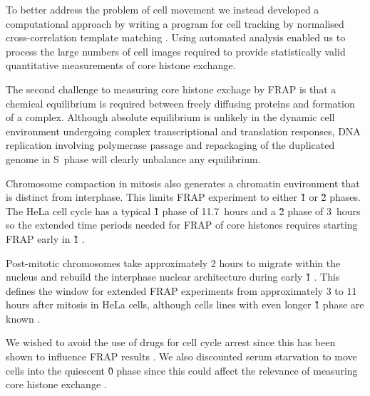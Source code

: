     To better address the problem of cell movement we
    instead developed a computational approach
    by writing a program for cell tracking by normalised
    cross-correlation template matching  .
    Using automated analysis enabled us to process
    the large numbers of cell images
    required to provide statistically valid
    quantitative measurements of core histone exchange.


    The second challenge to measuring core histone exchage by FRAP is that
    a chemical equilibrium is required between freely diffusing proteins and
    formation of a complex. Although absolute equilibrium is unlikely
    in the dynamic cell environment undergoing
    complex transcriptional and translation responses,
    DNA replication involving polymerase passage
    and repackaging of the duplicated genome
    in S~phase will clearly unbalance any equilibrium.

    Chromosome compaction in mitosis also generates a chromatin environment
    that is distinct from interphase.
    This limits FRAP experiment to either \G1{} or \G2{} phases.
    The HeLa cell cycle has a typical \G1{} phase of 11.7~hours
    and a \G2{} phase of 3~hours \citep{HeLaCellCycle}
    so the extended time periods needed for FRAP of core histones requires
    starting FRAP early in \G1{} .

    Post-mitotic chromosomes take approximately 2 hours
    to migrate within the nucleus
    and rebuild the interphase nuclear architecture during early \G1{}
    \citep{visualizationG1chromosomes,earlyg1position,RelativeChromosomePosition}.
    This defines the window for extended FRAP experiments
    from approximately 3 to 11 hours after mitosis
    in HeLa cells, although cells lines with even longer
    \G1{} phase are known \citep{PancreaticCells}.

    We wished to avoid the use of drugs for cell
    cycle arrest since this has been
    shown to influence FRAP results \addref{}.
    We also discounted serum starvation to move cells into the
    quiescent \G0{} phase since this could affect
    the relevance of measuring core histone
    exchange \citep{SerumStarvation} .

